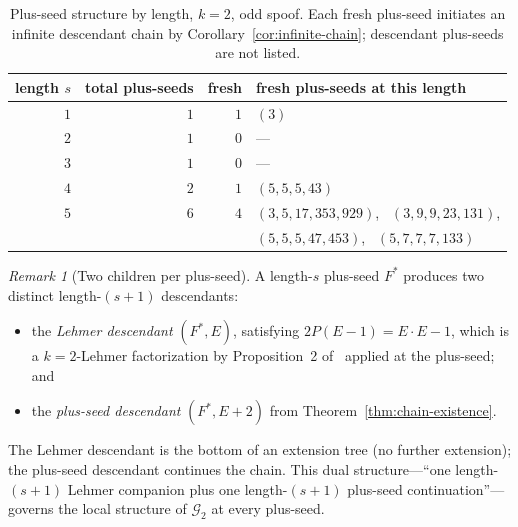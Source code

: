 \documentclass[11pt]{article}
\theoremstyle{definition}
\theoremstyle{remark}
\newtheorem{remark}[theorem]{Remark}
\begin{document}
\begin{table}[ht]
\centering
\caption{Plus-seed structure by length, $k = 2$, odd spoof.  Each
fresh plus-seed initiates an infinite descendant chain by
Corollary~\ref{cor:infinite-chain}; descendant plus-seeds are not
listed.}
\label{tab:plus-seeds-by-length}
\smallskip
\begin{tabular}{@{}rrrl@{}}
\toprule
length $s$ & total plus-seeds & fresh & fresh plus-seeds at this length \\
\midrule
$1$ & $1$ & $1$ & $(3)$ \\
$2$ & $1$ & $0$ & --- \\
$3$ & $1$ & $0$ & --- \\
$4$ & $2$ & $1$ & $(5, 5, 5, 43)$ \\
$5$ & $6$ & $4$ & $(3, 5, 17, 353, 929)$,~ $(3, 9, 9, 23, 131)$, \\
    &     &     & $(5, 5, 5, 47, 453)$,~ $(5, 7, 7, 7, 133)$ \\
\bottomrule
\end{tabular}
\end{table}

\begin{remark}[Two children per plus-seed]
A length-$s$ plus-seed $F^*$ produces two distinct length-$(s+1)$
descendants:
\begin{itemize}
  \item the \emph{Lehmer descendant} $(F^*, E)$, satisfying $2 P
    (E - 1) = E \cdot E - 1$, which is a $k = 2$-Lehmer factorization
    by Proposition~2 of~\cite{Mfinish} applied at the plus-seed; and
  \item the \emph{plus-seed descendant} $(F^*, E + 2)$ from
    Theorem~\ref{thm:chain-existence}.
\end{itemize}
The Lehmer descendant is the bottom of an extension tree (no further
extension); the plus-seed descendant continues the chain.  This dual
structure---``one length-$(s+1)$ Lehmer companion plus one
length-$(s+1)$ plus-seed continuation''---governs the local structure
of $\mathcal{G}_2$ at every plus-seed.
\end{remark}
\end{document}
